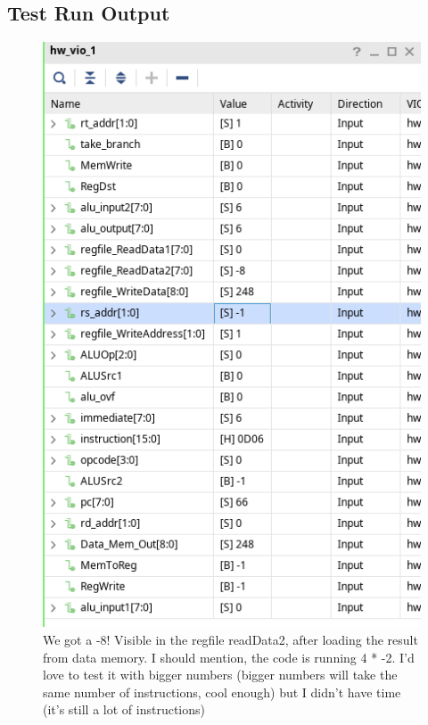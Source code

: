 \documentclass[12pt,a4paper]{article}
\begin{document}
\newpage
\subsection*{Test Run Output}
\begin{figure}
	\includegraphics[width=\textwidth]{image}
	\caption{We got a -8! Visible in the regfile readData2, after loading the result from data memory.
		I should mention, the code is running 4 * -2. I'd love to test it with bigger numbers
		(bigger numbers will take the same number of instructions, cool enough) but I didn't have
		time (it's still a lot of instructions)}
\end{figure}
\end{document}
